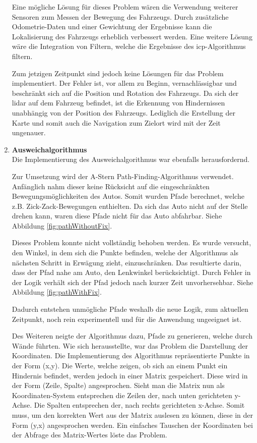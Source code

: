 \begin{enumerate}[leftmargin=*]
    Eine mögliche Lösung für dieses Problem wären die Verwendung weiterer Sensoren zum Messen der Bewegung des Fahrzeugs.
    Durch zusätzliche Odometrie-Daten und einer Gewichtung der Ergebnisse kann die Lokalisierung des Fahrzeugs erheblich verbessert werden.
    Eine weitere Lösung wäre die Integration von Filtern, welche die Ergebnisse des \ac{icp}-Algorithmus filtern.

    Zum jetzigen Zeitpunkt sind jedoch keine Lösungen für das Problem implementiert.
    Der Fehler ist, vor allem zu Beginn, vernachlässigbar und beschränkt sich auf die Position und Rotation des Fahrzeugs.
    Da sich der \ac{lidar} auf dem Fahrzeug befindet, ist die Erkennung von Hindernissen unabhängig von der Position des Fahrzeugs.
    Lediglich die Erstellung der Karte und somit auch die Navigation zum Zielort wird mit der Zeit ungenauer.

    \item \textbf{Ausweichalgorithmus} \\
    Die Implementierung des Ausweichalgorithmus war ebenfalls herausfordernd.
    
    Zur Umsetzung wird der A-Stern Path-Finding-Algorithmus verwendet.
    Anfänglich nahm dieser keine Rücksicht auf die eingeschränkten Bewegungsmöglichkeiten des Autos.
    Somit wurden Pfade berechnet, welche z.B. Zick-Zack-Bewegungen enthielten.
    Da sich das Auto nicht auf der Stelle drehen kann, waren diese Pfade nicht für das Auto abfahrbar.
    Siehe Abbildung \ref{fig:pathWithoutFix}.

    Dieses Problem konnte nicht vollständig behoben werden.
    Es wurde versucht, den Winkel, in dem sich die Punkte befinden, welche der Algorithmus als nächsten Schritt in Erwägung zieht, einzuschränken.
    Das resultierte darin, dass der Pfad nahe am Auto, den Lenkwinkel berücksichtigt.
    Durch Fehler in der Logik verhält sich der Pfad jedoch nach kurzer Zeit unvorhersehbar.
    Siehe Abbildung \ref{fig:pathWithFix}.

    Dadurch entstehen unmögliche Pfade weshalb die neue Logik, zum aktuellen Zeitpunkt, noch rein experimentell und für die Anwendung ungeeignet ist.

    Des Weiteren neigte der Algorithmus dazu, Pfade zu generieren, welche durch Wände führten.
    Wie sich herausstellte, war das Problem die Darstellung der Koordinaten.
    Die Implementierung des Algorithmus repräsentierte Punkte in der Form (x,y).
    Die Werte, welche zeigen, ob sich an einem Punkt ein Hindernis befindet, werden jedoch in einer Matrix gespeichert.
    Diese wird in der Form (Zeile, Spalte) angesprochen.
    Sieht man die Matrix nun als Koordinaten-System entsprechen die Zeilen der, nach unten gerichteten y-Achse.
    Die Spalten entsprechen der, nach rechts gerichteten x-Achse.
    Somit muss, um den korrekten Wert aus der Matrix auslesen zu können, diese in der Form (y,x) angesprochen werden.
    Ein einfaches Tauschen der Koordinaten bei der Abfrage des Matrix-Wertes löste das Problem.
\end{enumerate}


